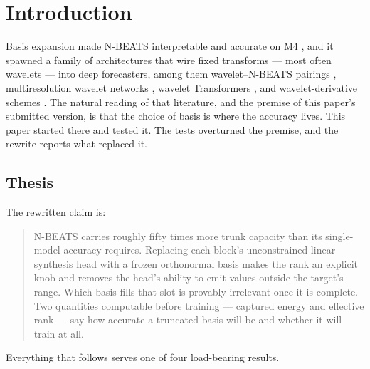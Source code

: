 
\section{Introduction}
\label{sec:intro}

Basis expansion made N-BEATS interpretable and accurate on M4
\citep{oreshkin2020nbeats, makridakis2020m4}, and it spawned a family of
architectures that wire fixed transforms --- most often wavelets
\citep{mallat1989wavelet, daubechies1992ten} --- into deep forecasters, among
them wavelet--N-BEATS pairings \citep{pramanick2024fusion}, multiresolution
wavelet networks \citep{deznabi2023multiwave}, wavelet Transformers
\citep{sasal2022wtransformers}, and wavelet-derivative schemes
\citep{zhou2025wavets}. The natural reading of that literature, and the
premise of this paper's submitted version, is that the choice of basis is
where the accuracy lives. This paper started there and tested it. The tests
overturned the premise, and the rewrite reports what replaced it.

\subsection{Thesis}

The rewritten claim is:

\begin{quote}
N-BEATS carries roughly fifty times more trunk capacity than its
single-model accuracy requires. Replacing each block's unconstrained linear
synthesis head with a frozen orthonormal basis makes the rank an explicit
knob and removes the head's ability to emit values outside the target's
range. Which basis fills that slot is provably irrelevant once it is
complete. Two quantities computable before training --- captured energy and
effective rank --- say how accurate a truncated basis will be and whether it
will train at all.
\end{quote}

Everything that follows serves one of four load-bearing results.

